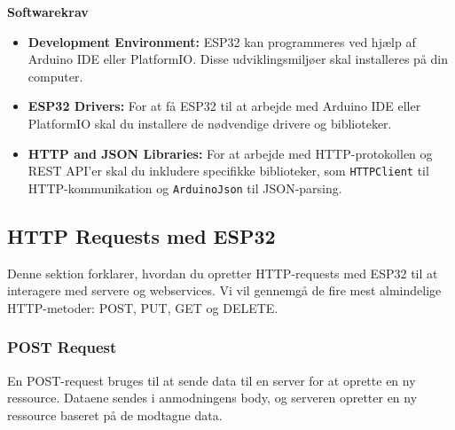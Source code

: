 \documentclass[12pt,a4paper]{book}
\begin{document}
	\textbf{Softwarekrav}
	\begin{itemize}
		\item \textbf{Development Environment:} ESP32 kan programmeres ved hjælp af Arduino IDE eller PlatformIO. Disse udviklingsmiljøer skal installeres på din computer.
		\item \textbf{ESP32 Drivers:} For at få ESP32 til at arbejde med Arduino IDE eller PlatformIO skal du installere de nødvendige drivere og biblioteker.
		\item \textbf{HTTP and JSON Libraries:} For at arbejde med HTTP-protokollen og REST API'er skal du inkludere specifikke biblioteker, som \texttt{HTTPClient} til HTTP-kommunikation og \texttt{ArduinoJson} til JSON-parsing.
	\end{itemize}
	
	\subsection*{HTTP Requests med ESP32}
	
	Denne sektion forklarer, hvordan du opretter HTTP-requests med ESP32 til at interagere med servere og webservices. Vi vil gennemgå de fire mest almindelige HTTP-metoder: POST, PUT, GET og DELETE.
	
	\subsubsection*{POST Request}
	En POST-request bruges til at sende data til en server for at oprette en ny ressource. Dataene sendes i anmodningens body, og serveren opretter en ny ressource baseret på de modtagne data.
	
\end{document}
